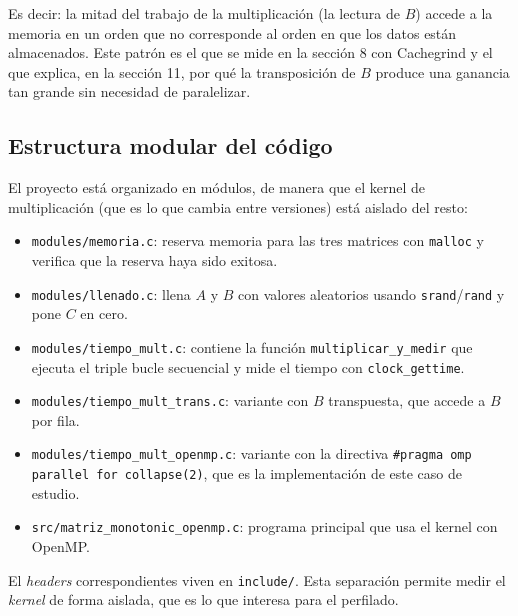 Es decir: la mitad del trabajo de la multiplicación (la lectura de $B$) accede a la memoria en un orden que no corresponde al orden en que los datos están almacenados. Este patrón es el que se mide en la sección 8 con Cachegrind y el que explica, en la sección 11, por qué la transposición de $B$ produce una ganancia tan grande sin necesidad de paralelizar.

\subsection{Estructura modular del código}

El proyecto está organizado en módulos, de manera que el kernel de multiplicación (que es lo que cambia entre versiones) está aislado del resto:

\begin{itemize}
    \item \texttt{modules/memoria.c}: reserva memoria para las tres matrices con \texttt{malloc} y verifica que la reserva haya sido exitosa.
    \item \texttt{modules/llenado.c}: llena $A$ y $B$ con valores aleatorios usando \texttt{srand}/\texttt{rand} y pone $C$ en cero.
    \item \texttt{modules/tiempo\_mult.c}: contiene la función \texttt{multiplicar\_y\_medir} que ejecuta el triple bucle secuencial y mide el tiempo con \texttt{clock\_gettime}.
    \item \texttt{modules/tiempo\_mult\_trans.c}: variante con $B$ transpuesta, que accede a $B$ por fila.
    \item \texttt{modules/tiempo\_mult\_openmp.c}: variante con la directiva \texttt{\#pragma omp parallel for collapse(2)}, que es la implementación de este caso de estudio.
    \item \texttt{src/matriz\_monotonic\_openmp.c}: programa principal que usa el kernel con OpenMP.
\end{itemize}

El \textit{headers} correspondientes viven en \texttt{include/}. Esta separación permite medir el \emph{kernel} de forma aislada, que es lo que interesa para el perfilado.
